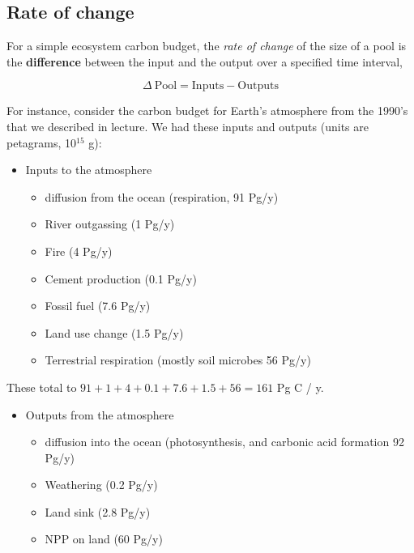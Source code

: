 \documentclass[
  letterpaper,
  DIV=11,
  numbers=noendperiod]{scrreprt}
\providecommand{\tightlist}{%
  \setlength{\itemsep}{0pt}\setlength{\parskip}{0pt}}
\begin{document}
\subsection{Rate of change}\label{rate-of-change}

For a simple ecosystem carbon budget, the \emph{rate of change} of the
size of a pool is the \textbf{difference} between the input and the
output over a specified time interval,

\[\Delta~\mathrm{Pool} = \mathrm{Inputs} - \mathrm{Outputs}\]

For instance, consider the carbon budget for Earth's atmosphere from the
1990's that we described in lecture. We had these inputs and outputs
(units are petagrams, 10\(^{15}\) g):

\begin{itemize}
\tightlist
\item
  Inputs to the atmosphere

  \begin{itemize}
  \tightlist
  \item
    diffusion from the ocean (respiration, 91 Pg/y)
  \item
    River outgassing (1 Pg/y)
  \item
    Fire (4 Pg/y)
  \item
    Cement production (0.1 Pg/y)
  \item
    Fossil fuel (7.6 Pg/y)
  \item
    Land use change (1.5 Pg/y)
  \item
    Terrestrial respiration (mostly soil microbes 56 Pg/y)
  \end{itemize}
\end{itemize}

These total to \(91+1+4+0.1+7.6+1.5+56=161\) Pg C / y.

\begin{itemize}
\tightlist
\item
  Outputs from the atmosphere

  \begin{itemize}
  \tightlist
  \item
    diffusion into the ocean (photosynthesis, and carbonic acid
    formation 92 Pg/y)
  \item
    Weathering (0.2 Pg/y)
  \item
    Land sink (2.8 Pg/y)
  \item
    NPP on land (60 Pg/y)
  \end{itemize}
\end{itemize}
\end{document}
